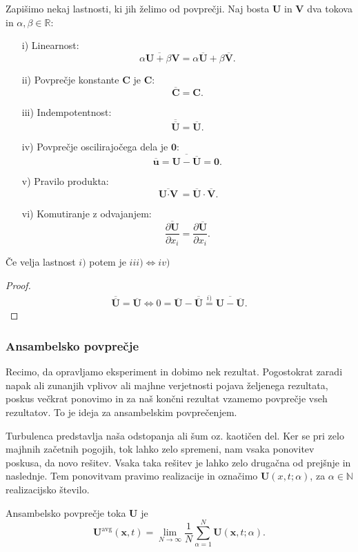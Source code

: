 \documentclass[mat2, tisk]{fmfdelo}
\newcommand{\R}{\mathbb R}
\newcommand{\N}{\mathbb N}
\newcommand{\bd}{\textbf}
\begin{document}
Zapišimo nekaj lastnosti, ki jih želimo od povprečji. Naj bosta $\bd{U}$ in $\bd{V}$ dva tokova in 
$\alpha, \beta \in \R$:
\begin{enumerate}
  \item[i)] Linearnost: 
  $$\overline{\alpha \bd{U} + \beta \bd{V}} = \alpha \overline{\bd{U}} + \beta\overline{\bd{V}}.$$
  \item[ii)] Povprečje konstante $\bd{C}$ je $\bd{C}$:
  $$ \overline{\bd{C}} = \bd{C}.$$
  \item[iii)] Indempotentnost:
  $$ \overline{\overline{\bd{U}}} = \overline{\bd{U}}.$$
  \item[iv)] Povprečje oscilirajočega dela je $\bd{0}$:
  $$ \overline{\bd{u}} = \overline{\bd{U} - \overline{\bd{U}}} = \bd{0}.$$
  \item[v)] Pravilo produkta: 
  $$ \overline{\bd{U}\cdot \bd{V}} = \overline{\bd{U}}\cdot \overline{\bd{V}}. $$
  \item[vi)] Komutiranje z odvajanjem:
  $$ \overline{\frac{\partial \bd{U}}{\partial x_i}} = \frac{\partial \overline{\bd{U}}}{\partial x_i}.$$
\end{enumerate}

\begin{lema}
Če velja lastnost $i)$ potem je $iii) \iff iv)$
\end{lema}

\begin{proof}
\begin{align*}
\overline{\overline{\bd{U}}} = \overline{\bd{U}} \iff 0 = \overline{\bd{U}} - \overline{\overline{\bd{U}}} \stackrel{i)}{=} 
\overline{\bd{U} - \overline{\bd{U}}}.
\end{align*}
\end{proof}

\subsubsection{Ansambelsko povprečje}
Recimo, da opravljamo eksperiment in dobimo nek rezultat. Pogostokrat zaradi napak ali 
zunanjih vplivov ali majhne verjetnosti pojava željenega rezultata, poskus večkrat ponovimo in 
za naš končni rezultat vzamemo povprečje vseh rezultatov. To je ideja za ansambelskim 
povprečenjem.

Turbulenca predstavlja naša odstopanja ali šum oz. kaotičen del.
Ker se pri zelo majhnih začetnih pogojih, tok lahko zelo spremeni, nam vsaka ponovitev 
poskusa, da novo rešitev. Vsaka taka rešitev je lahko zelo drugačna od prejšnje in naslednje. 
Tem ponovitvam pravimo realizacije in označimo $\bd{U}(x, t; \alpha)$, za $\alpha \in \N$
realizacijsko število. 
\begin{definicija}
Ansambelsko povprečje toka $\bd{U}$ je 
\begin{equation}
\bd{U}^\text{avg}(\bd{x}, t) = \lim_{N\rightarrow \infty} \frac{1}{N}\sum_{\alpha=1}^N \bd{U}(\bd{x}, t;\alpha). 
\end{equation}
\end{definicija}
\end{document}
